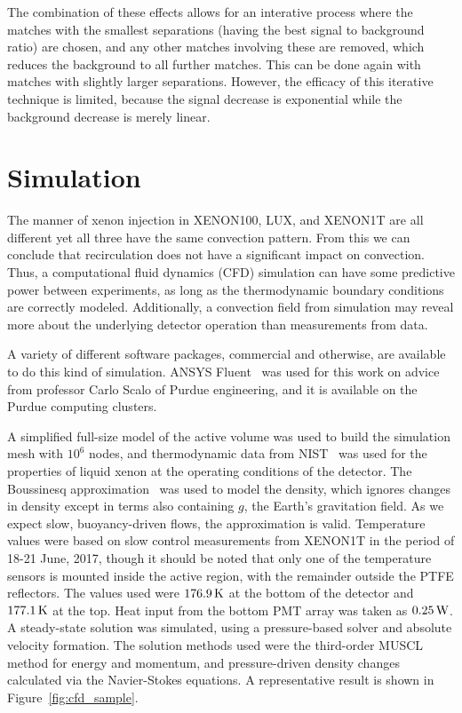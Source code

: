 The combination of these effects allows for an interative process where the matches with the smallest separations (having the best signal to background ratio) are chosen, and any other matches involving these are removed, which reduces the background to all further matches. This can be done again with matches with slightly larger separations. However, the efficacy of this iterative technique is limited, because the signal decrease is exponential while the background decrease is merely linear.

\section{Simulation}

The manner of xenon injection in XENON100, LUX, and XENON1T are all different yet all three have the same convection pattern. From this we can conclude that recirculation does not have a significant impact on convection. Thus, a computational fluid dynamics (CFD) simulation can have some predictive power between experiments, as long as the thermodynamic boundary conditions are correctly modeled. Additionally, a convection field from simulation may reveal more about the underlying detector operation than measurements from data.

A variety of different software packages, commercial and otherwise, are available to do this kind of simulation. ANSYS Fluent~\cite{fluent} was used for this work on advice from professor Carlo Scalo of Purdue engineering, and it is available on the Purdue computing clusters.

A simplified full-size model of the active volume was used to build the simulation mesh with $10^6$ nodes, and thermodynamic data from NIST~\cite{NIST} was used for the properties of liquid xenon at the operating conditions of the detector. The Boussinesq approximation~\cite{Boussinesq:1897} was used to model the density, which ignores changes in density except in terms also containing $g$, the Earth's gravitation field. As we expect slow, buoyancy-driven flows, the approximation is valid. Temperature values were based on slow control measurements from XENON1T in the period of 18-21 June, 2017, though it should be noted that only one of the temperature sensors is mounted inside the active region, with the remainder outside the PTFE reflectors. The values used were $176.9\,\mathrm{K}$ at the bottom of the detector and $177.1\,\mathrm{K}$ at the top. Heat input from the bottom PMT array was taken as $0.25\,\mathrm{W}$. A steady-state solution was simulated, using a pressure-based solver and absolute velocity formation. The solution methods used were the third-order MUSCL method for energy and momentum, and pressure-driven density changes calculated via the Navier-Stokes equations. A representative result is shown in Figure~\ref{fig:cfd_sample}.

